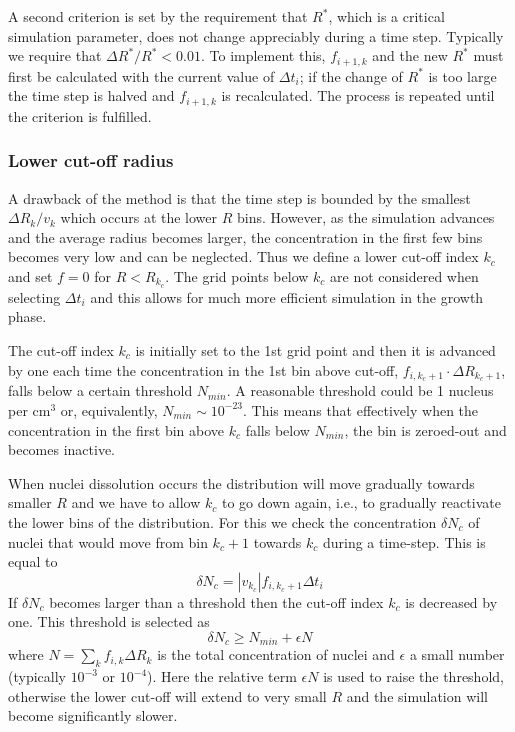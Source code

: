 \documentclass[12pt,a4paper]{article}
\begin{document}
A second criterion is set by the requirement that $R^*$, which is a critical simulation parameter, does not change appreciably during a time step. Typically we require that $\Delta R^* / R^* < 0.01$. To implement this, $f_{i+1,k}$ and the new $R^*$ must first be calculated with the current value of $\Delta t_i$; if the change of $R^*$ is too large the time step is halved and $f_{i+1,k}$ is recalculated. The process is repeated until the criterion is fulfilled. 

\subsubsection{Lower cut-off radius} 

A drawback of the method is that the time step is bounded by the smallest $\Delta R_k / v_k$ which occurs at the lower $R$ bins. However, as the simulation advances and the average radius becomes larger, the concentration in the first few bins becomes very low and can be neglected. Thus we define a lower cut-off index $k_c$ and set $f=0$ for $R<R_{k_c}$. The grid points below $k_c$ are not considered when selecting  $\Delta t_i$ and this allows for much more efficient simulation in the growth phase. 

The cut-off index $k_c$ is initially set to the 1st grid point and then it is advanced by one each time the concentration in the 1st bin above cut-off, $f_{i,k_c+1}\cdot \Delta R_{k_c+1}$, falls below a certain threshold $N_{min}$. A reasonable threshold could be 1 nucleus per cm$^3$ or, equivalently, $N_{min}\sim 10^{-23}$. This means that effectively when the concentration in the first bin above $k_c$ falls below $N_{min}$, the bin is zeroed-out and becomes inactive. 

When nuclei dissolution occurs the distribution will move gradually towards smaller $R$ and we have to allow $k_c$ to go down again, i.e., to gradually reactivate the lower bins of the distribution. For this we check the concentration $\delta N_c$ of nuclei that would move from bin $k_c+1$ towards $k_c$ during a time-step. This is equal to 
\[
\delta N_c = |v_{k_c}| f_{i,k_c+1} \Delta t_i
\] 
If $\delta N_c$ becomes larger than a threshold then the cut-off index $k_c$ is decreased by one. This threshold is selected as
\begin{equation}
\delta N_c \geq N_{min} + \epsilon N
\end{equation}
where $N = \sum_k {f_{i,k} \Delta R_k}$ is the total concentration of nuclei and $\epsilon$ a small number (typically $10^{-3}$ or $10^{-4}$). Here the relative term $\epsilon N$ is used to raise the threshold, otherwise the lower cut-off will extend to very small $R$ and the simulation will become significantly slower. 
\end{document}
